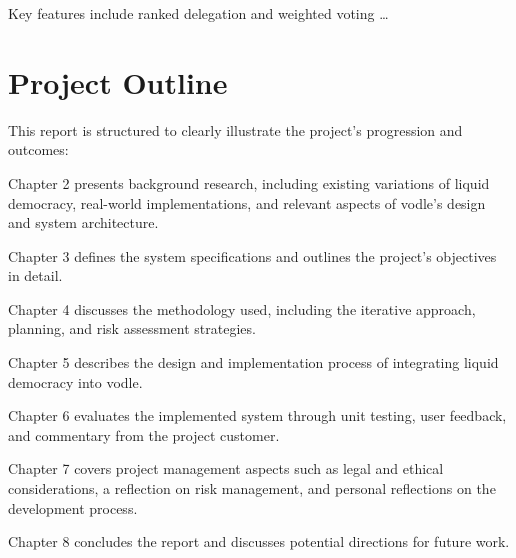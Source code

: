 Key features include ranked delegation and weighted voting \dots

\section{Project Outline}
This report is structured to clearly illustrate the project's progression and outcomes:

Chapter 2 presents background research, including existing variations of liquid democracy, real-world implementations, and relevant aspects of vodle's design and system architecture.

Chapter 3 defines the system specifications and outlines the project's objectives in detail.

Chapter 4 discusses the methodology used, including the iterative approach, planning, and risk assessment strategies.

Chapter 5 describes the design and implementation process of integrating liquid democracy into vodle.

Chapter 6 evaluates the implemented system through unit testing, user feedback, and commentary from the project customer.

Chapter 7 covers project management aspects such as legal and ethical considerations, a reflection on risk management, and personal reflections on the development process.

Chapter 8 concludes the report and discusses potential directions for future work.